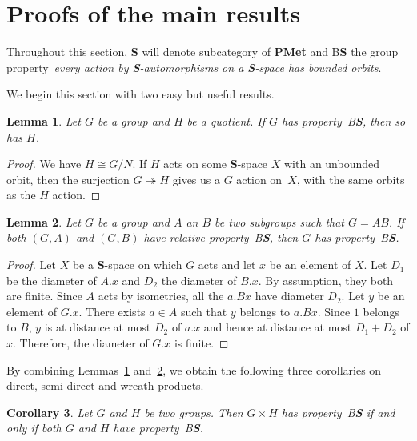 \documentclass[a4paper]{article}
\newtheorem{lem}{Lemma}[section]
\newtheorem{cor}[lem]{Corollary}
\theoremstyle{definition}
\newcommand*{\category}[1]{\textbf{#1}}
\newcommand*{\PMet}{\category{PMet}}
\newcommand*{\CatS}{\category{S}}
\newcommand*{\BS}{B\textbf{S}}
\begin{document}
\section{Proofs of the main results}
\label{Section:Proof}
%
%
%
Throughout this section, \CatS{} will denote subcategory of \PMet{} and \BS{} the group property~\emph{every action by \CatS-automorphisms on a \CatS-space has bounded orbits}.

We begin this section with two easy but useful results.
%
%
\begin{lem}\label{Lemma:Quotient}
Let $G$ be a group and $H$ be a quotient.
If $G$ has property~\BS, then so has $H$.
\end{lem}
\begin{proof}
We have $H\cong G/N$.
If $H$ acts on some \CatS-space $X$ with an unbounded orbit, then the surjection $G\twoheadrightarrow H$ gives us a $G$ action on~$X$, with the same orbits as the $H$ action.
\end{proof}
%
%
\begin{lem}\label{Lemma:InterProd}
Let $G$ be a group and $A$ an $B$ be two subgroups such that $G=AB$.
If both $(G,A)$ and $(G,B)$ have relative property~\BS, then $G$ has property~\BS.
\end{lem}
\begin{proof}
Let $X$ be a \CatS-space on which $G$ acts %
and let $x$ be an element of $X$.
Let $D_1$ be the diameter of $A.x$ and $D_2$ the diameter of $B.x$. By assumption, they both are finite.
Since $A$ acts by isometries, all the $a.Bx$ have diameter $D_2$.
Let $y$ be an element of $G.x$. There exists $a\in A$ such that $y$ belongs to $a.Bx$. Since $1$ belongs to $B$, $y$ is at distance at most $D_2$ of $a.x$ and hence at distance at most $D_1+D_2$ of $x$.
Therefore, the diameter of $G.x$ is finite.
\end{proof}
%
%
By combining Lemmas~\ref{Lemma:Quotient} and~\ref{Lemma:InterProd}, we obtain the following three corollaries on direct, semi-direct and wreath products.
%
%
\begin{cor}\label{Cor:Prod}
Let $G$ and $H$ be two groups. Then $G\times H$ has property~\BS{} if and only if both $G$ and $H$ have property~\BS.
\end{cor}
\end{document}
